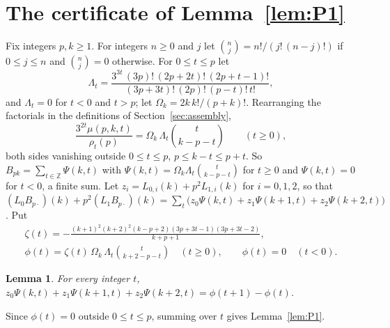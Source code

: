 \documentclass[11pt]{amsart}
\newtheorem{lemma}[theorem]{Lemma}
\theoremstyle{definition}
\numberwithin{equation}{section}
\newcommand{\lean}[1]{\ignorespaces}
\newcommand{\Z}{\mathbb{Z}}
\begin{document}



\appendix
\section{The certificate of Lemma~\ref{lem:P1}}\label{app:cert}

Fix integers $p,k\ge1$. For integers $n\ge0$ and $j$ let $\binom nj=n!/(j!\,(n-j)!)$ if $0\le j\le n$ and $\binom nj=0$ otherwise. For $0\le t\le p$ let
\[
\Lambda_t=\frac{3^{3t}\,(3p)!\,(2p+2t)!\,(2p+t-1)!}{(3p+3t)!\,(2p)!\,(p-t)!\,t!},
\]
and $\Lambda_t=0$ for $t<0$ and $t>p$; let $\Omega_k=2k\,k!/(p+k)!$. Rearranging the factorials in the definitions of Section~\ref{sec:assembly},
\[
\frac{3^{2t}\mu(p,k,t)}{\rho_t(p)}=\Omega_k\,\Lambda_t\binom{t}{k-p-t}\qquad(t\ge0),
\]
both sides vanishing outside $0\le t\le p$, $p\le k-t\le p+t$. So $B_{pk}=\sum_{t\in\Z}\Psi(k,t)$ with $\Psi(k,t)=\Omega_k\Lambda_t\binom{t}{k-p-t}$ for $t\ge0$ and $\Psi(k,t)=0$ for $t<0$, a finite sum. Let $z_i=L_{0,i}(k)+p^2L_{1,i}(k)$ for $i=0,1,2$, so that $(L_0B_{p\cdot})(k)+p^2(L_1B_{p\cdot})(k)=\sum_t\bigl(z_0\Psi(k,t)+z_1\Psi(k+1,t)+z_2\Psi(k+2,t)\bigr)$. Put
\begin{gather*}
\zeta(t)=-\frac{(k+1)^2(k+2)^2(k-p+2)(3p+3t-1)(3p+3t-2)}{k+p+1},\\
\phi(t)=\zeta(t)\,\Omega_k\,\Lambda_t\binom{t}{k+2-p-t}\quad(t\ge0),\qquad \phi(t)=0\quad(t<0).
\end{gather*}

\begin{lemma}\label{lem:cert}\lean{CalegariSlopes.ADB.Proof.cert, CalegariSlopes.ADB.Proof.claim_cleared}
For every integer $t$, $z_0\Psi(k,t)+z_1\Psi(k+1,t)+z_2\Psi(k+2,t)=\phi(t+1)-\phi(t)$.
\end{lemma}

Since $\phi(t)=0$ outside $0\le t\le p$, summing over $t$ gives Lemma~\ref{lem:P1}.
\end{document}
